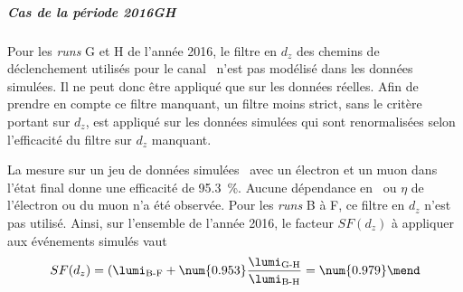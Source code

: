 \subparagraph{Cas de la période 2016GH}
Pour les \emph{runs} G et H de l'année 2016, le filtre en $d_z$ des chemins de déclenchement utilisés pour le canal \ele\mu\ n'est pas modélisé dans les données simulées.
Il ne peut donc être appliqué que sur les données réelles.
Afin de prendre en compte ce filtre manquant, un filtre moins strict, sans le critère portant sur $d_z$, est appliqué sur les données simulées qui sont renormalisées selon l'efficacité du filtre sur $d_z$ manquant.
\par
La mesure sur un jeu de données simulées \ttbar\ avec un électron et un muon dans l'état final donne une efficacité de \SI{95.3}{\%}.
Aucune dépendance en \pT\ ou $\eta$ de l'électron ou du muon n'a été observée.
Pour les \emph{runs} B à F, ce filtre en $d_z$ n'est pas utilisé.
Ainsi, sur l'ensemble de l'année 2016, le facteur $SF(d_z)$ à appliquer aux événements simulés vaut
\begin{equation}
SF(d_z) = (\lumi_\text{B-F} + \num{0.953}\frac{\lumi_\text{G-H}}{\lumi_\text{B-H}} = \num{0.979}\mend
\end{equation}

